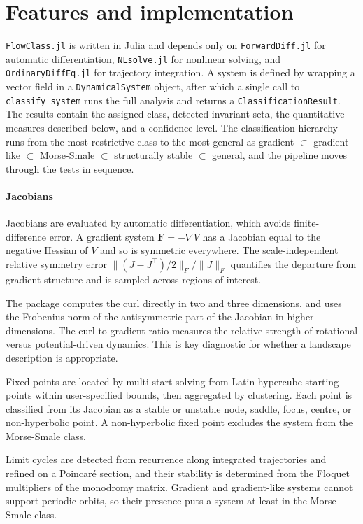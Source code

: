 \documentclass[unnumsec,webpdf,contemporary,large,namedate]{oup-authoring-template}
\begin{document}
\section{Features and implementation}

\texttt{FlowClass.jl} is written in  Julia \citep{Bezanson:2017,
Roesch2023} and depends only on \texttt{ForwardDiff.jl} for automatic
differentiation, \texttt{NLsolve.jl} for nonlinear solving, and
\texttt{OrdinaryDiffEq.jl} for trajectory integration. A system is defined by
wrapping a vector field in a \texttt{DynamicalSystem} object, after which a
single call to \texttt{classify\_system} runs the full analysis and returns a
\texttt{ClassificationResult}. The results contain the assigned class, 
detected invariant seta, the quantitative measures described below, and a
confidence level. The classification hierarchy runs from the most restrictive
class to the most general as gradient $\subset$ gradient-like $\subset$
Morse-Smale $\subset$ structurally stable $\subset$ general, and the pipeline
moves through the tests in sequence.

\paragraph{Jacobians}
 Jacobians are evaluated by automatic
differentiation, which avoids finite-difference error. A gradient system
$\bm{F} = -\nabla V$ has a Jacobian equal to the negative Hessian of $V$ and so
is symmetric everywhere. The scale-independent relative symmetry error $\|(J -
J^{\top})/2\|_F / \|J\|_F$ quantifies the departure from gradient structure and
is sampled across  regions of interest.

The package computes the curl directly in two and three dimensions, and uses the Frobenius norm of the antisymmetric part of
the Jacobian  in higher dimensions. The curl-to-gradient ratio measures the relative strength of rotational versus potential-driven
dynamics. This is key diagnostic for whether a landscape description is
appropriate.


 Fixed points are located by multi-start solving from Latin hypercube starting points within user-specified bounds, then
aggregated by clustering. Each point is classified from its Jacobian  as a stable or unstable node, saddle, focus, centre, or
non-hyperbolic point. A non-hyperbolic fixed point excludes the system from the
Morse-Smale class.

 Limit cycles are detected from recurrence along
integrated trajectories and refined on a Poincar\'e section, and their stability
is determined from the Floquet multipliers of the monodromy matrix. Gradient and
gradient-like systems cannot support periodic orbits, so their presence puts a
system at least in the Morse-Smale class.
\end{document}

